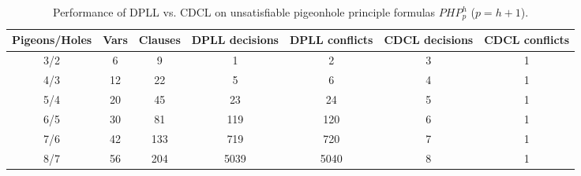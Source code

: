 \begin{table}[h!]
\centering
\begin{tabular}{c|cccccc}
\hline
Pigeons/Holes & Vars & Clauses & \textbf{DPLL} decisions & DPLL conflicts & \textbf{CDCL} decisions & CDCL conflicts \\
\hline
3/2 & 6 & 9 & 1 & 2 & 3 & 1 \\
4/3 & 12 & 22 & 5 & 6 & 4 & 1 \\
5/4 & 20 & 45 & 23 & 24 & 5 & 1 \\
6/5 & 30 & 81 & 119 & 120 & 6 & 1 \\
7/6 & 42 & 133 & 719 & 720 & 7 & 1 \\
8/7 & 56 & 204 & 5039 & 5040 & 8 & 1 \\
\hline
\end{tabular}
\caption{Performance of DPLL vs. CDCL on unsatisfiable pigeonhole principle formulas $PHP_{p}^{h}$ ($p=h+1$).}
\label{tab:pigeonhole}
\end{table}
